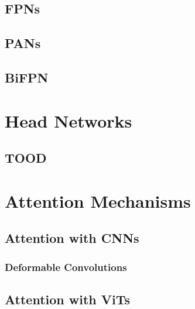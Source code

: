 \section{FPNs}
\section{PANs}
\section{BiFPN}

\chapter{Head Networks}
\section{TOOD}

\chapter{Attention Mechanisms}
\section{Attention with CNNs}
\subsection{Deformable Convolutions}
\section{Attention with ViTs}
